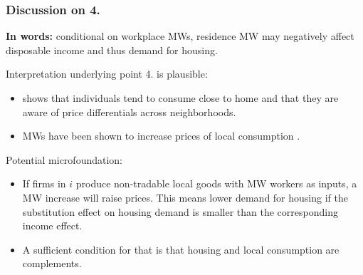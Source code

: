 \documentclass[aspectratio=169, t]{beamer}
\begin{document}
\begin{frame}[label = discuss4]
    \frametitle{Discussion on 4.}
    
    
    \textbf{In words:} conditional on workplace MWs, residence MW may negatively affect disposable income
     and thus demand for housing.
     
     \pause 
     \vspace{2mm}

    Interpretation underlying point 4. is plausible:
    \begin{itemize}
        \item \textcite{MiyauchiEtAl2021} shows that individuals tend to consume close to home and that 
        they are aware of price differentials across neighborhoods.
        \item MWs have been shown to increase prices of local consumption 
        \parencite[e.g.,][]{AllegrettoReich2018, LeungForthcoming}.
    \end{itemize}

    \pause 
    \vspace{2mm}

    Potential microfoundation:
    \begin{itemize}
        \item If firms in $i$ produce non-tradable local goods with MW workers as inputs, 
        a MW increase will raise prices. This means lower demand for housing if the 
        substitution effect on housing demand is smaller than the corresponding income effect. 
        \item A sufficient condition for that is that housing and local consumption are complements. 
        
        \hyperlink{microfound}{}
    \end{itemize}
\end{frame}
\end{document}
